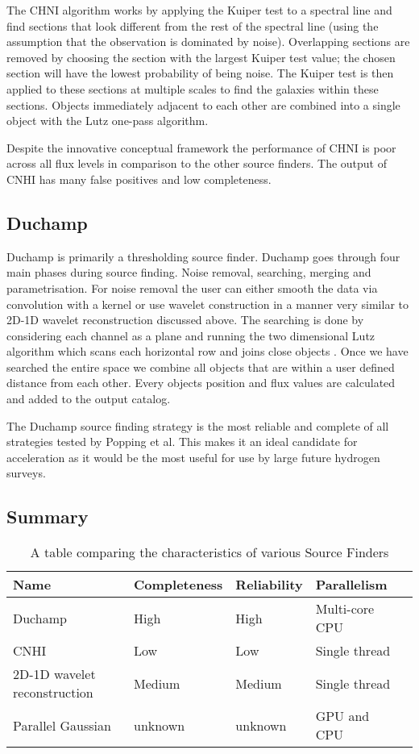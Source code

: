 \documentclass[prodmode,acmtecs]{acmsmall} \usepackage[ruled]{algorithm2e}
\begin{document}
     The CHNI algorithm works by applying the Kuiper test to a spectral line and find sections 
     that look different from the rest of the spectral line (using the assumption that the
     observation is dominated by noise). Overlapping sections are removed by choosing the 
     section with the largest Kuiper test value; the chosen section will have the lowest probability
     of being noise. The Kuiper test is then applied to these sections at multiple scales to
     find the galaxies within these sections. Objects immediately adjacent to each other
     are combined into a single object with the Lutz one-pass algorithm.
     
     Despite the innovative conceptual framework the performance of CHNI is poor across all
     flux levels in comparison to the other source finders. The output of CNHI has many 
     false positives and low completeness. \cite{popping2012comparison}
     
     \subsection{Duchamp}
Duchamp is primarily a thresholding source finder. Duchamp goes through four main phases during source finding.
Noise removal, searching, merging and parametrisation. For noise removal the user can either smooth the data
via convolution with a kernel or use wavelet construction in a manner very similar to 2D-1D wavelet
reconstruction discussed above. The searching is done by considering each channel as a plane and running the two dimensional
Lutz algorithm which scans each horizontal row and joins close objects \cite{lutz1980algorithm}. Once we have searched the entire
space we combine all objects that are within a user defined distance from each other. Every objects position
and flux values are calculated and added to the output catalog. \cite{whiting2012duchamp}


The Duchamp source finding strategy  is the most reliable and complete of all strategies tested 
by Popping et al. This makes it an ideal candidate for acceleration as it would
be the most useful for use by large future hydrogen surveys. 

    \subsection{Summary}
\begin{table}[h!]
    \begin{tabular}{|l | l | l | l | l| }
    \hline
    Name  & Completeness & Reliability & Parallelism \\
    \hline
    \hline
    Duchamp  & High & High & Multi-core CPU \\
    \hline
    CNHI  & Low & Low & Single thread \\
    \hline
    2D-1D wavelet reconstruction & Medium & Medium & Single thread \\
    \hline
    Parallel Gaussian  & unknown & unknown & GPU and CPU \\
    \hline
    \end{tabular}
\caption{A table comparing the characteristics of various Source Finders}
\end{table}
\end{document}
